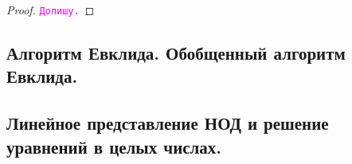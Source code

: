 \documentclass[11pt]{article}
\begin{document}
\begin{proof}

    \textcolor{magenta}{\texttt{Допишу.}}

\end{proof}

\subsection{Алгоритм Евклида. Обобщенный алгоритм Евклида.}
\subsection{Линейное представление НОД и решение уравнений в целых числах.}
\end{document}
